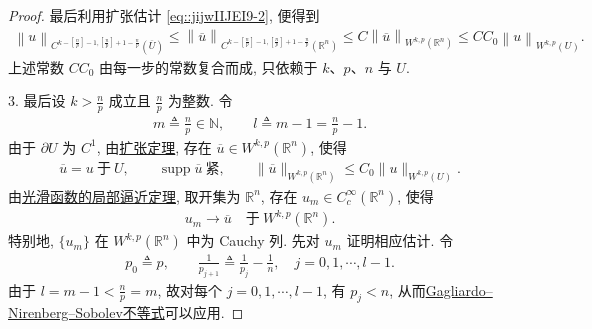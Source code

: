\documentclass[../../main.tex]{subfiles}
\begin{document}
\begin{proof}
最后利用扩张估计 \eqref{eq::jijwIIJEI9-2}, 便得到
\begin{align*}
\left\| u \right\| _{C^{k-\left[ \frac{n}{p} \right] -1,\left[ \frac{n}{p} \right] +1-\frac{n}{p}}(\overline{U})}\leqslant \left\| \overline{u} \right\| _{C^{k-\left[ \frac{n}{p} \right] -1,\left[ \frac{n}{p} \right] +1-\frac{n}{p}}(\mathbb{R} ^n)}\leqslant C\left\| \overline{u} \right\| _{W^{k,p}(\mathbb{R} ^n)}\leqslant CC_0\left\| u \right\| _{W^{k,p}(U)}.
\end{align*}
上述常数 $CC_0$ 由每一步的常数复合而成, 只依赖于 $k$、$p$、$n$ 与 $U$.

3. 最后设 $k>\frac{n}{p}$ 成立且 $\frac{n}{p}$ 为整数. 令
\begin{align*}
m\triangleq\frac{n}{p}\in\mathbb{N},\qquad l\triangleq m-1=\frac{n}{p}-1.
\end{align*}
由于 $\partial U$ 为 $C^{1}$, 由\hyperref[theorem:ch05-扩张定理]{扩张定理}, 存在 $\overline{u}\in W^{k,p}(\mathbb{R}^{n})$, 使得
\begin{align}\label{eq::jijwIIJEI9-3}
\overline{u}=u\ \text{于}\ U,\qquad \operatorname{supp}\overline{u}\ \text{紧},\qquad
\|\overline{u}\|_{W^{k,p}(\mathbb{R}^{n})}\leqslant C_{0}\|u\|_{W^{k,p}(U)}.
\end{align}
由\hyperref[theorem:ch05-光滑函数的局部逼近定理]{光滑函数的局部逼近定理}, 取开集为 $\mathbb{R}^{n}$, 存在 $u_{m}\in C_{c}^{\infty}(\mathbb{R}^{n})$, 使得
\begin{align}\label{eq::jijwIIJEI9-3-m}
u_{m}\to\overline{u}\quad\text{于}\ W^{k,p}(\mathbb{R}^{n}).
\end{align}
特别地, $\{u_{m}\}$ 在 $W^{k,p}(\mathbb{R}^{n})$ 中为 Cauchy 列.
先对 $u_{m}$ 证明相应估计. 令
\begin{align*}
p_{0}\triangleq p,\qquad \frac{1}{p_{j+1}}\triangleq\frac{1}{p_{j}}-\frac{1}{n},\quad j=0,1,\cdots,l-1.
\end{align*}
由于 $l=m-1<\frac{n}{p}=m$, 故对每个 $j=0,1,\cdots,l-1$, 有 $p_{j}<n$, 从而\hyperref[theorem:Gagliardo--Nirenberg--Sobolev不等式]{Gagliardo--Nirenberg--Sobolev不等式}可以应用.


\end{proof}
\end{document}

